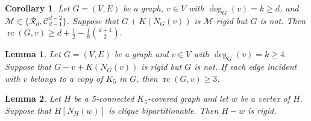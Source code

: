 \documentclass[10pt,a4paper]{amsart}
\newtheorem{lemma}{Lemma}
\newtheorem{corollary}{Corollary}
\newcommand{\cC}{\mathcal{C}}
\newcommand{\cM}{\mathcal{M}}
\newcommand{\cR}{\mathcal{R}}
\DeclareMathOperator{\rc}{rc}
\begin{document}
\begin{corollary}\label{coro:rc:geq:d}
Let $ G=(V, E)$ be a graph, $v\in V$ with $\deg_G(v)=k\geq d$, and
		$\cM\in\{\cR_d,\cC_{d-1}^{d-2}\}$.
        Suppose that $G+K(N_G(v))$ is $\mathcal{M}$-rigid but $G$ is not.
		Then $\rc(G,v)\geq d+\frac{1}{2}-\frac{1}{k}{\binom{d+1}{2}}.$
\end{corollary}

\begin{lemma}\label{lem:mainC5lemma}
    Let $G=(V,E)$ be a graph and $v\in V$ with $\deg_G(v)=k\geq 4$.
    Suppose that  $G-v+K(N_G(v))$ is rigid but $G$ is not. If each edge incident with $v$ belongs to a copy of $K_5$ in $G$, then
    $\rc(G,v)\geq 3$.
\end{lemma}

\begin{lemma}\label{lem:canbecovered}
    Let $H$ be a 5-connected $K_5$-covered graph  and let $w$ be a vertex of $H$. 
    Suppose that  $H[N_{H}(w)]$
    is clique bipartitionable.
    Then $H-w$ is rigid.
\end{lemma}
\end{document}
